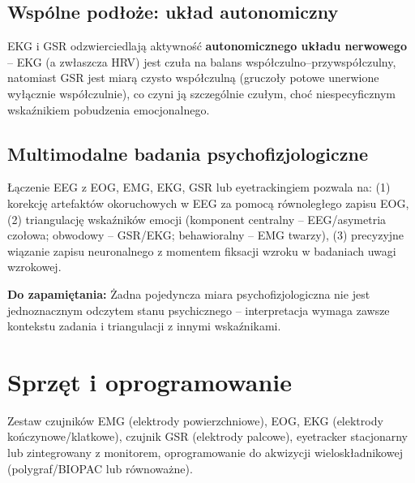 \documentclass[11pt,a4paper]{article}
\newcommand{\infobox}[1]{%
  \par\noindent\colorbox{lgray}{\parbox{\dimexpr\linewidth-2\fboxsep}{\vspace{2pt}#1\vspace{2pt}}}\par\vspace{4pt}}
\begin{document}
\subsection{Wspólne podłoże: układ autonomiczny}
EKG i GSR odzwierciedlają aktywność \textbf{autonomicznego układu nerwowego} -- EKG (a zwłaszcza HRV) jest czuła na balans współczulno--przywspółczulny, natomiast GSR jest miarą czysto współczulną (gruczoły potowe unerwione wyłącznie współczulnie), co czyni ją szczególnie czułym, choć niespecyficznym wskaźnikiem pobudzenia emocjonalnego.

\subsection{Multimodalne badania psychofizjologiczne}
Łączenie EEG z EOG, EMG, EKG, GSR lub eyetrackingiem pozwala na: (1) korekcję artefaktów okoruchowych w EEG za pomocą równoległego zapisu EOG, (2) triangulację wskaźników emocji (komponent centralny -- EEG/asymetria czołowa; obwodowy -- GSR/EKG; behawioralny -- EMG twarzy), (3) precyzyjne wiązanie zapisu neuronalnego z momentem fiksacji wzroku w badaniach uwagi wzrokowej.

\infobox{\textbf{Do zapamiętania:} Żadna pojedyncza miara psychofizjologiczna nie jest jednoznacznym \guillemotleft odczytem\guillemotright{} stanu psychicznego -- interpretacja wymaga zawsze kontekstu zadania i triangulacji z innymi wskaźnikami.}

\section{Sprzęt i oprogramowanie}
Zestaw czujników EMG (elektrody powierzchniowe), EOG, EKG (elektrody kończynowe/klatkowe), czujnik GSR (elektrody palcowe), eyetracker stacjonarny lub zintegrowany z monitorem, oprogramowanie do akwizycji wieloskładnikowej (polygraf/BIOPAC lub równoważne).
\end{document}
